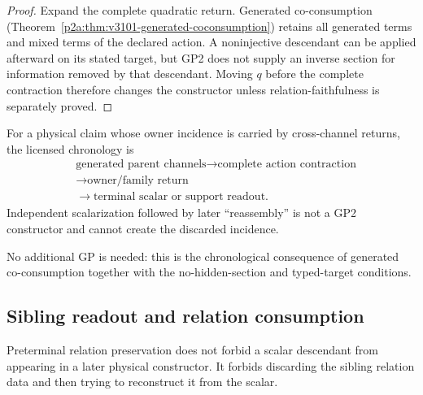 \documentclass[12pt,a4paper]{article}
\begin{document}
\begin{proof}
Expand the complete quadratic return.  Generated co-consumption
(Theorem~\ref{p2a:thm:v3101-generated-coconsumption}) retains all generated
terms and mixed terms of the declared action.  A noninjective descendant can
be applied afterward on its stated target, but GP2 does not supply an inverse
section for information removed by that descendant.  Moving $q$ before the
complete contraction therefore changes the constructor unless
relation-faithfulness is separately proved.
\end{proof}

\begin{corollary}
\label{p2a:cor:v3102-construct-before-terminalize}
For a physical claim whose owner incidence is carried by cross-channel returns,
the licensed chronology is
\[
 \boxed{\begin{aligned}
  &\text{generated parent channels}
    \to\text{complete action contraction}\\
  &\to\text{owner/family return}\\
  &\to\text{terminal scalar or support readout}.
 \end{aligned}}
\]
Independent scalarization followed by later ``reassembly'' is not a GP2
constructor and cannot create the discarded incidence.
\end{corollary}

\begin{remark}
\label{p2a:rem:v3102-no-new-gp}
No additional GP is needed: this is the chronological consequence of
generated co-consumption together with the no-hidden-section and
typed-target conditions.
\end{remark}

\subsection{Sibling readout and relation consumption}
\label{p2a:sec:v3103-sibling-output-consumption}
Preterminal relation preservation does not forbid a scalar descendant from
appearing in a later physical constructor.  It forbids discarding the sibling
relation data and then trying to reconstruct it from the scalar.
\end{document}
